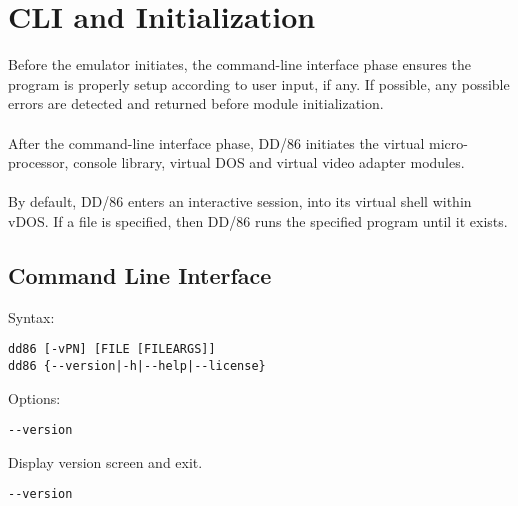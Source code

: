 \chapter{CLI and Initialization}

Before the emulator initiates, the command-line interface phase ensures the program is
properly setup according to user input, if any. If possible, any possible errors are detected
and returned before module initialization.
\\\\
After the command-line interface phase, DD/86 initiates the virtual micro-processor,
console library, virtual DOS and virtual video adapter modules.
\\\\
By default, DD/86 enters an interactive session, into its virtual shell within vDOS. If a file is
specified, then DD/86 runs the specified program until it exists.

\section{Command Line Interface}

Syntax:
\begin{verbatim}
dd86 [-vPN] [FILE [FILEARGS]]
dd86 {--version|-h|--help|--license}
\end{verbatim}

Options:
\begin{verbatim}
--version
\end{verbatim}
Display version screen and exit.

\begin{verbatim}
--version
\end{verbatim}
